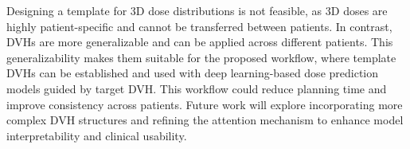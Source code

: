 Designing a template for 3D dose distributions is not feasible, as 3D doses are highly patient-specific and cannot be transferred between patients.
In contrast, DVHs are more generalizable and can be applied across different patients.
This generalizability makes them suitable for the proposed workflow, where template DVHs can be established and used with deep learning-based dose prediction models guided by target DVH.
This workflow could reduce planning time and improve consistency across patients.
Future work will explore incorporating more complex DVH structures and refining the attention mechanism to enhance model interpretability and clinical usability.
